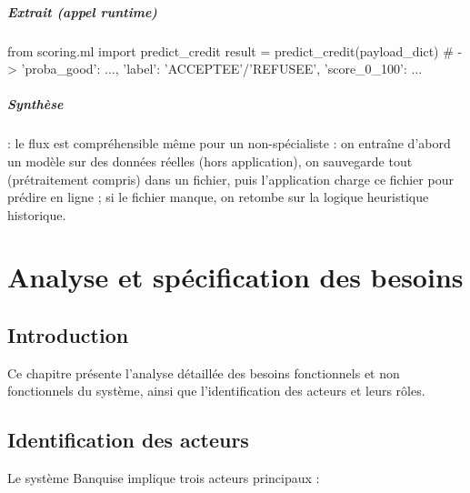 \documentclass[12pt,a4paper]{report}
\begin{document}
\paragraph{Extrait (appel runtime)} 
\begin{CodeBlock}
from scoring.ml import predict_credit
result = predict_credit(payload_dict)
# -> {'proba_good': ..., 'label': 'ACCEPTEE'/'REFUSEE', 'score_0_100': ...}
\end{CodeBlock}
\paragraph{Synthèse} : le flux est compréhensible même pour un non-spécialiste : on entraîne d'abord un modèle sur des données réelles (hors application), on sauvegarde tout (prétraitement compris) dans un fichier, puis l'application charge ce fichier pour prédire en ligne ; si le fichier manque, on retombe sur la logique heuristique historique.

\chapter{Analyse et spécification des besoins}

\section{Introduction}
Ce chapitre présente l'analyse détaillée des besoins fonctionnels et non fonctionnels du système, ainsi que l'identification des acteurs et leurs rôles.

\section{Identification des acteurs}

Le système Banquise implique trois acteurs principaux :
\end{document}
